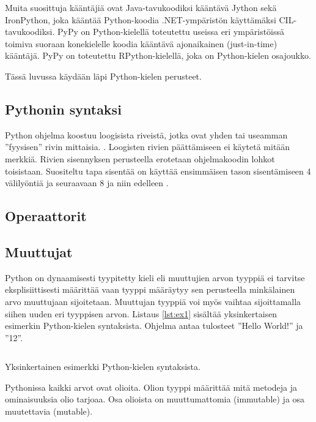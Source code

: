 \documentclass[finnish]{tktltiki2}
\theoremstyle{definition}
\theoremstyle{remark}
\begin{document}
Muita suosittuja kääntäjiä ovat Java-tavukoodiksi kääntävä Jython sekä IronPython, joka kääntää Python-koodia .NET-ympäristön käyttämäksi CIL-tavukoodiksi. PyPy on Python-kielellä toteutettu useissa eri ympäristöissä toimiva suoraan konekielelle koodia kääntävä ajonaikainen (just-in-time) kääntäjä. PyPy on toteutettu RPython-kielellä, joka on Python-kielen osajoukko.

Tässä luvussa käydään läpi Python-kielen perusteet.

\subsection{Pythonin syntaksi}

Python ohjelma koostuu loogisista riveistä, jotka ovat yhden tai useamman ''fyysisen'' rivin mittaisia. \cite{martelli2006python}. Loogisten rivien päättämiseen ei käytetä mitään merkkiä. Rivien sisennyksen perusteella erotetaan ohjelmakoodin lohkot toisistaan. Suositeltu tapa sisentää on käyttää ensimmäisen tason sisentämiseen 4 välilyöntiä ja seuraavaan 8 ja niin edelleen \cite{pep8}. 

\subsection{Operaattorit}

\subsection{Muuttujat}

Python on dynaamisesti tyypitetty kieli eli muuttujien arvon tyyppiä ei tarvitse eksplisiittisesti määrittää vaan tyyppi määräytyy sen perusteella minkälainen arvo muuttujaan sijoitetaan. Muuttujan tyyppiä voi myös vaihtaa sijoittamalla siihen uuden eri tyyppisen arvon. Listaus \ref{lst:ex1} sisältää yksinkertaisen esimerkin Python-kielen syntaksista. Ohjelma antaa tulosteet ''Hello World!'' ja ''12''.

\begin{listing}
    \inputminted{python}{code/foo.py}
    \label{lst:ex1}
    \caption{Yksinkertainen esimerkki Python-kielen syntaksista.}
\end{listing}

Pythonissa kaikki arvot ovat olioita. Olion tyyppi määrittää mitä metodeja ja ominaisuuksia olio tarjoaa. Osa olioista on muuttumattomia (immutable) ja osa muutettavia (mutable).
\end{document}
